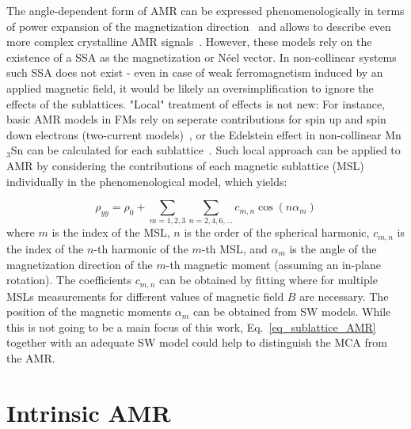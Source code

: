 \documentclass[prb,showpacs,amsmath,amssymb,superscriptaddress,twocolumn,floatfix]{revtex4-1}
\begin{document}
The angle-dependent form of AMR can be expressed phenomenologically in terms of power expansion of the magnetization direction~\cite{Doring:1938,Limmer:2008,DeRanieri:2008} and allows to describe even more complex crystalline AMR signals~\cite{Ritzinger:2021, Gonzalez-Betancourt:2024, NamHai:2012}. However, these models rely on the existence of a SSA as the magnetization or N\'eel vector. In non-collinear systems such SSA does not exist - even in case of weak ferromagnetism induced by an applied magnetic field, it would be likely an oversimplification to ignore the effects of the sublattices. "Local" treatment of effects is not new: For instance, basic AMR models in FMs rely on seperate contributions for spin up and spin down electrons (two-current models)~\cite{Ritzinger:2023}, or the Edelstein effect in non-collinear Mn$_3$Sn can be calculated for each sublattice~\cite{Gonzalez-Hernandez:2024}. Such local approach can be applied to AMR by considering the contributions of each magnetic sublattice (MSL) individually in the phenomenological model, which yields:

\begin{equation}
	\rho_{yy} = \rho_0 + \sum_{m = 1,2,3} \sum_{n = 2, 4, 6, ...} c_{m,n} \cos(n \alpha_m)
	\label{eq_sublattice_AMR}
\end{equation}
where $m$ is the index of the MSL, $n$ is the order of the spherical harmonic, $c_{m,n}$ is the index of the $n$-th harmonic of the $m$-th MSL, and $\alpha_m$ is the angle of the magnetization direction of the $m$-th magnetic moment (assuming an in-plane rotation). The coefficients $c_{m,n}$ can be obtained by fitting where for multiple MSLs measurements for different values of magnetic field $B$ are necessary. The position of the magnetic moments $\alpha_m$ can be obtained from SW models. While this is not going to be a main focus of this work, Eq.~\ref{eq_sublattice_AMR} together with an adequate SW model could help to distinguish the MCA from the AMR.



\section{Intrinsic AMR}
\label{sec_intrinsic}
\end{document}
